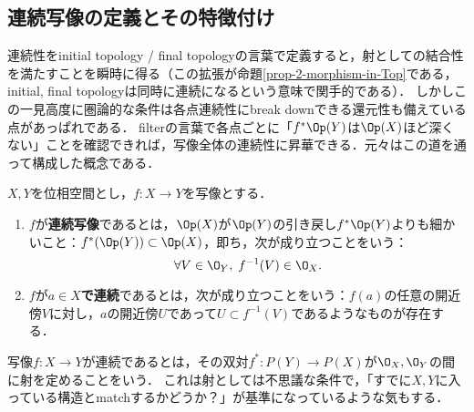 \documentclass[uplatex,dvipdfmx]{jsreport}
\begin{document}
\subsection{連続写像の定義とその特徴付け}

\begin{tcolorbox}[colframe=ForestGreen, colback=ForestGreen!10!white, breakable]
    連続性をinitial topology / final topologyの言葉で定義すると，射としての結合性を満たすことを瞬時に得る（この拡張が命題\ref{prop-2-morphism-in-Top}である，initial, final topologyは同時に連続になるという意味で関手的である）．
    しかしこの一見高度に圏論的な条件は各点連続性にbreak downできる還元性も備えている点があっぱれである．
    filterの言葉で各点ごとに「$f^*\Op(Y)$は$\Op(X)$ほど深くない」ことを確認できれば，写像全体の連続性に昇華できる．元々はこの道を通って構成した概念である．
\end{tcolorbox}

\begin{definition}\label{def-continuous-function}
    $X,Y$を位相空間とし，$f:X\to Y$を写像とする．
    \begin{enumerate}
        \item $f$が\textbf{連続写像}であるとは，$\Op(X)$が$\Op(Y)$の引き戻し$f^*\Op(Y)$よりも細かいこと：$f^*(\Op(Y))\subset\Op(X)$，即ち，次が成り立つことをいう：\[\forall V\in\O_Y,\;f^{-1}(V)\in\O_X.\]
        \item $f$が\textbf{$a\in X$で連続}であるとは，次が成り立つことをいう：$f(a)$の任意の開近傍$V$に対し，$a$の開近傍$U$であって$U\subset f^{-1}(V)$であるようなものが存在する．
    \end{enumerate}
\end{definition}
\begin{remark}
    写像$f:X\to Y$が連続であるとは，その双対$f^*:P(Y)\to P(X)$が$\O_X,\O_Y$の間に射を定めることをいう．
    これは射としては不思議な条件で，「すでに$X,Y$に入っている構造とmatchするかどうか？」が基準になっているような気もする．
\end{remark}
\end{document}
